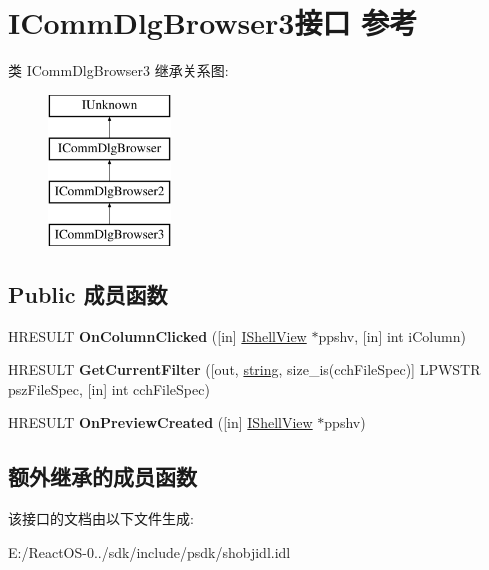 \hypertarget{interface_i_comm_dlg_browser3}{}\section{I\+Comm\+Dlg\+Browser3接口 参考}
\label{interface_i_comm_dlg_browser3}
类 I\+Comm\+Dlg\+Browser3 继承关系图\+:\begin{figure}[H]
\begin{center}
\leavevmode
\includegraphics[height=4.000000cm]{interface_i_comm_dlg_browser3}
\end{center}
\end{figure}
\subsection*{Public 成员函数}
\begin{DoxyCompactItemize}
\item 
\mbox{\label{interface_i_comm_dlg_browser3_a830de5ceeb3e023cbcbf67660231860d}} 
H\+R\+E\+S\+U\+LT {\bfseries On\+Column\+Clicked} (\mbox{[}in\mbox{]} \hyperlink{interface_i_shell_view}{I\+Shell\+View} $\ast$ppshv, \mbox{[}in\mbox{]} int i\+Column)
\item 
\mbox{\label{interface_i_comm_dlg_browser3_a1c8b2e5344b2dd7096aae7048f991d8a}} 
H\+R\+E\+S\+U\+LT {\bfseries Get\+Current\+Filter} (\mbox{[}out, \hyperlink{structstring}{string}, size\+\_\+is(cch\+File\+Spec)\mbox{]} L\+P\+W\+S\+TR psz\+File\+Spec, \mbox{[}in\mbox{]} int cch\+File\+Spec)
\item 
\mbox{\label{interface_i_comm_dlg_browser3_a810b910a6906d5fb2c4230d78b7765ed}} 
H\+R\+E\+S\+U\+LT {\bfseries On\+Preview\+Created} (\mbox{[}in\mbox{]} \hyperlink{interface_i_shell_view}{I\+Shell\+View} $\ast$ppshv)
\end{DoxyCompactItemize}
\subsection*{额外继承的成员函数}


该接口的文档由以下文件生成\+:\begin{DoxyCompactItemize}
\item 
E\+:/\+React\+O\+S-\/0../sdk/include/psdk/shobjidl.\+idl\end{DoxyCompactItemize}
